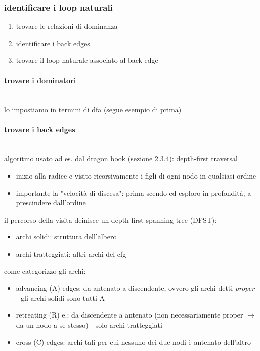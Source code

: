 \subsubsection{identificare i loop naturali}

\begin{enumerate}
  \item trovare le relazioni di dominanza
  \item identificare i back edges
  \item trovare il loop naturale associato al back edge
\end{enumerate}

\paragraph{trovare i dominatori}~\\

lo impostiamo in termini di dfa (segue esempio di prima)

\paragraph{trovare i back edges}~\\

algoritmo usato ad es. dal dragon book (sezione 2.3.4): depth-first traversal

\begin{itemize}
  \item inizio alla radice e visito ricorsivamente i figli di ogni nodo in qualsiasi ordine
  \item importante la "velocit\`a di discesa": prima scendo ed esploro in profondit\`a, a prescindere dall'ordine
\end{itemize}

il percorso della visita deinisce un depth-first spanning tree (DFST):
\begin{itemize}
  \item archi solidi: struttura dell'albero
  \item archi tratteggiati: altri archi del cfg
\end{itemize}

come categorizzo gli archi:
\begin{itemize}
  \item advancing (A) edges: da antenato a discendente, ovvero gli archi detti \textit{proper} - gli archi solidi sono tutti A
  \item retreating (R) e.: da discendente a antenato (non necessariamente proper $\rightarrow$ da un nodo a se stesso) - solo archi tratteggiati
  \item cross (C) edges: archi tali per cui nessuno dei due nodi \`e antenato dell'altro
\end{itemize}

